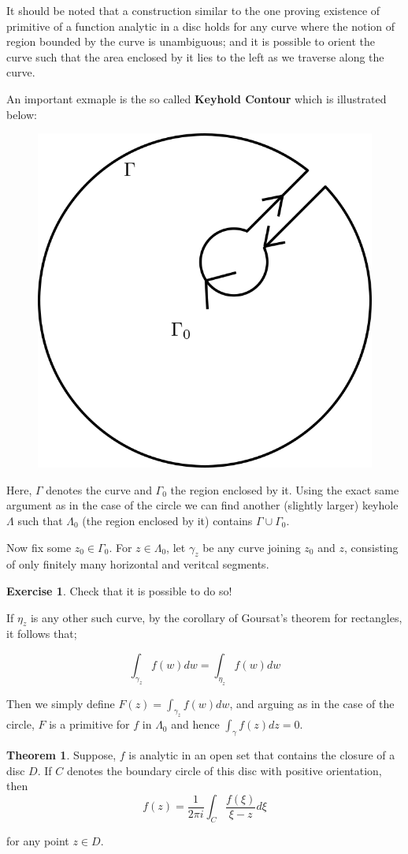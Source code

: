 \documentclass[12pt]{article}
\theoremstyle{definition}
\newtheorem{thm}{Theorem}
\newtheorem{ex}{Exercise}
\newenvironment{theorem}{
\begin{tcolorbox}[colback=green!5!white,colframe=green!75!black, parbox = false]\begin{thm} }{\end{thm}\end{tcolorbox} }
\newenvironment{example}{
\begin{tcolorbox}[colback=blue!5!white,colframe=blue!75!black, title = Example, parbox = false] }{\end{tcolorbox} }
\newenvironment{exercise}{
\begin{tcolorbox}[colback=red!5!white,colframe=red!75!black, parbox = false]\begin{ex} }{\end{ex}\end{tcolorbox} }
\begin{document}
It should be noted that a construction similar to the one proving existence of primitive of a function analytic in a disc holds for any curve where the notion of region bounded by the curve is unambiguous; and it is possible to orient the curve such that the area enclosed by it lies to the left as we traverse along the curve.

An important exmaple is the so called \textbf{Keyhold Contour} which is illustrated below:

\begin{figure}[h]
    \centering
    \includegraphics[width = 0.3\linewidth]{complex-figures/keyhole-contour.png}
\end{figure}

\begin{example}
    Here, $\Gamma$ denotes the curve and $\Gamma_0$ the region enclosed by it. Using the exact same argument as in the case of the circle we can find another (slightly larger) keyhole $\Lambda$ such that $\Lambda_0$ (the region enclosed by it) contains $\Gamma \cup \Gamma_0$.

    Now fix some $z_0 \in \Gamma_0$. For $z \in \Lambda_0$, let $\gamma_z$ be any curve joining $z_0$ and $z$, consisting of only finitely many horizontal and veritcal segments. 

    \begin{exercise}
        Check that it is possible to do so!
    \end{exercise}

    If $\eta_z$ is any other such curve, by the corollary of Goursat's theorem for rectangles, it follows that;

    $$\int_{\gamma_z} f(w) dw = \int_{\eta_z} f(w) dw$$

    Then we simply define $F(z) = \int_{\gamma_z} f(w)dw$, and arguing as in the case of the circle, $F$ is a primitive for $f$ in $\Lambda_0$ and hence $\int_{\gamma} f(z)dz = 0$.
\end{example}

\begin{theorem}
    Suppose, $f$ is analytic in an open set that contains the closure of a disc $D$. If $C$ denotes the boundary circle of this disc with positive orientation, then
    $$f(z) = \dfrac{1}{2\pi i} \int_{C} \dfrac{f(\xi)}{\xi - z} d\xi$$

    for any point $z \in D$.
\end{theorem}
\end{document}
